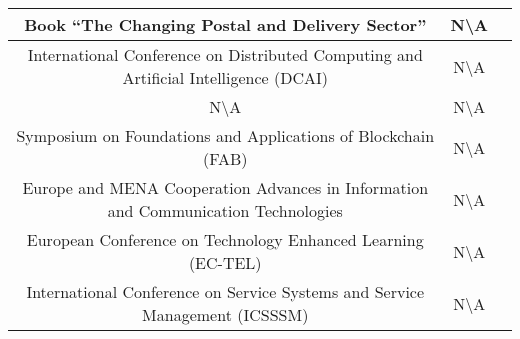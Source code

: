 \begin{landscape}
\begin{center}
\begin{tabular}{ |c|c|c| }
	 \hline
	 Book \enquote{The Changing Postal and Delivery Sector} & N\textbackslash A & \citet{2017_Jaag} \\ 
	 \hline
	 International Conference on Distributed Computing and Artificial Intelligence (DCAI) & N\textbackslash A & \citet{2016_Jacynycz} \\ 
	 \hline
	 N\textbackslash A & N\textbackslash A & \citet{2017_Liu} \\ 
	 \hline
	Symposium on Foundations and Applications of Blockchain (FAB) & N\textbackslash A & \citet{2018_Lucena} \\ 
	 \hline
	 Europe and MENA Cooperation Advances in Information and Communication Technologies & N\textbackslash A & \citet{2017_Ouaddah} \\ 
	 \hline
	 European Conference on Technology Enhanced Learning (EC-TEL) & N\textbackslash A & \citet{2016_Sharples} \\ 
	 \hline
	 International Conference on Service Systems and Service Management (ICSSSM) & N\textbackslash A & \citet{2016_Tian} \\ 
	 \hline
\end{tabular}
\end{center}

\end{landscape}


\clearpage
